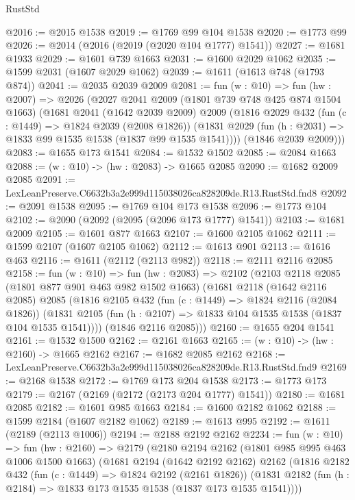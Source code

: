 \begin{lexlean}{RustStd}
\begin{coremodule}
@2016 := @2015 @1538
@2019 := @1769 @99 @104 @1538
@2020 := @1773 @99
@2026 := @2014 (@2016 (@2019 (@2020 @104 @1777) @1541))
@2027 := @1681 @1933
@2029 := @1601 @739 @1663
@2031 := @1600 @2029 @1062
@2035 := @1599 @2031 (@1607 @2029 @1062)
@2039 := @1611 (@1613 @748 (@1793 @874))
@2041 := @2035 @2039 @2009
@2081 := fun (w : @10) =>
  fun (hw : @2007) =>
  @2026
    (@2027
      @2041
      @2009
      (@1801 @739 @748 @425 @874 @1504 @1663)
      (@1681
        @2041
        (@1642 @2039 @2009)
        @2009
        (@1816
          @2029
          @432
          (fun (c : @1449) => @1824 @2039 (@2008 @1826))
          (@1831 @2029 (fun (h : @2031) => @1833 @99 @1535 @1538 (@1837 @99 @1535 @1541))))
        (@1846 @2039 @2009)))
@2083 := @1655 @173 @1541
@2084 := @1532 @1502
@2085 := @2084 @1663
@2088 := (w : @10) -> (hw : @2083) -> @1665 @2085
@2090 := @1682 @2009 @2085
@2091 := LexLeanPreserve.C6632b3a2e999d115038026ca828209de.R13.RustStd.fnd8
@2092 := @2091 @1538
@2095 := @1769 @104 @173 @1538
@2096 := @1773 @104
@2102 := @2090 (@2092 (@2095 (@2096 @173 @1777) @1541))
@2103 := @1681 @2009
@2105 := @1601 @877 @1663
@2107 := @1600 @2105 @1062
@2111 := @1599 @2107 (@1607 @2105 @1062)
@2112 := @1613 @901
@2113 := @1616 @463
@2116 := @1611 (@2112 (@2113 @982))
@2118 := @2111 @2116 @2085
@2158 := fun (w : @10) =>
  fun (hw : @2083) =>
  @2102
    (@2103
      @2118
      @2085
      (@1801 @877 @901 @463 @982 @1502 @1663)
      (@1681
        @2118
        (@1642 @2116 @2085)
        @2085
        (@1816
          @2105
          @432
          (fun (c : @1449) => @1824 @2116 (@2084 @1826))
          (@1831 @2105 (fun (h : @2107) => @1833 @104 @1535 @1538 (@1837 @104 @1535 @1541))))
        (@1846 @2116 @2085)))
@2160 := @1655 @204 @1541
@2161 := @1532 @1500
@2162 := @2161 @1663
@2165 := (w : @10) -> (hw : @2160) -> @1665 @2162
@2167 := @1682 @2085 @2162
@2168 := LexLeanPreserve.C6632b3a2e999d115038026ca828209de.R13.RustStd.fnd9
@2169 := @2168 @1538
@2172 := @1769 @173 @204 @1538
@2173 := @1773 @173
@2179 := @2167 (@2169 (@2172 (@2173 @204 @1777) @1541))
@2180 := @1681 @2085
@2182 := @1601 @985 @1663
@2184 := @1600 @2182 @1062
@2188 := @1599 @2184 (@1607 @2182 @1062)
@2189 := @1613 @995
@2192 := @1611 (@2189 (@2113 @1006))
@2194 := @2188 @2192 @2162
@2234 := fun (w : @10) =>
  fun (hw : @2160) =>
  @2179
    (@2180
      @2194
      @2162
      (@1801 @985 @995 @463 @1006 @1500 @1663)
      (@1681
        @2194
        (@1642 @2192 @2162)
        @2162
        (@1816
          @2182
          @432
          (fun (c : @1449) => @1824 @2192 (@2161 @1826))
          (@1831 @2182 (fun (h : @2184) => @1833 @173 @1535 @1538 (@1837 @173 @1535 @1541))))

\end{coremodule}
\end{lexlean}
